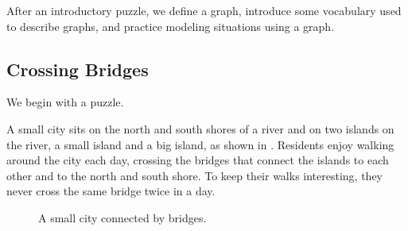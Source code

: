 After an introductory puzzle, we define a graph, introduce some vocabulary used to describe graphs, and practice modeling situations using a graph.

\newcommand{\subbridges}{Crossing Bridges}
\subsection{\subbridges}
\label{sub_bridges}

We begin with a puzzle.  

\begin{act}  %
\label{act_bridges}   
   A small city sits on the north and south shores of a river and on two islands on the river, a small island and a big island, as shown in . Residents enjoy walking around the city each day, crossing the bridges that connect the islands to each other and to the north and south shore. To keep their walks interesting, they never cross the same bridge twice in a day.

        \begin{figure}[hbtp]
            \centering
            
            \caption{A small city connected by bridges.}
            \label{fig_bridges}
        \end{figure}
    
        \begin{actpart}
        

\end{actpart}
\end{act}
